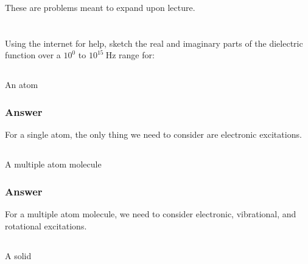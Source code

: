 \documentclass[12pt]{article}
\begin{document}
These are problems meant to expand upon lecture. 

\section{}
Using the internet for help, sketch the real and imaginary parts of the dielectric function over a $10^0$ to $10^{15} \mathrm{~Hz}$ range for:
\subsection{}
An atom
\subsubsection{Answer}
For a single atom, the only thing we need to consider are electronic excitations.
\subsection{}
A multiple atom molecule
\subsubsection{Answer}
For a multiple atom molecule, we need to consider electronic, vibrational, and rotational excitations.
\subsection{}
A solid
\end{document}

